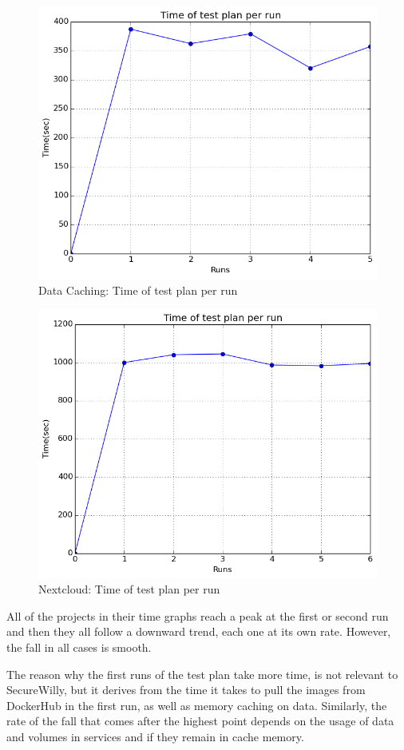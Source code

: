 \begin{figure}[h!]
  \centering
   \includegraphics[width=0.70\linewidth]{../figures/datacaching/time.png}
   \caption{Data Caching: Time of test plan per run}
\end{figure}

\begin{figure}[h!]
  \centering
   \includegraphics[width=0.75\linewidth]{../figures/nextcloud/time.png}
   \caption{Nextcloud: Time of test plan per run}
\end{figure}
\hfill\break

All of the projects in their time graphs reach a peak at the first or second run and then they all follow a downward trend, each one at its own rate. However, the fall in all cases is smooth.

The reason why the first runs of the test plan take more time, is not relevant to SecureWilly, but it derives from the time it takes to pull the images from DockerHub in the first run, as well as memory caching on data. Similarly, the rate of the fall that comes after the highest point depends on the usage of data and volumes in services and if they remain in cache memory.

